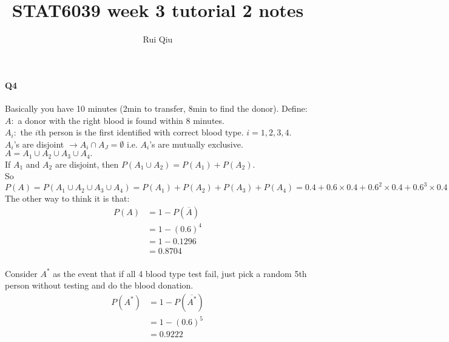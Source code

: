 \documentclass[a4paper, 11pt, twoside]{article}
\begin{document}
\title{STAT6039 week 3 tutorial 2 notes}
\author{Rui Qiu}

\maketitle

\paragraph{Q4}

Basically you have 10 minutes (2min to transfer, 8min to find the donor). Define:\\

$A:$ a donor with the right blood is found within 8 minutes.\\

$A_i:$ the $i$th person is the first identified with correct blood type. $i=1,2,3,4.$\\

$A_i$'s are disjoint $\rightarrow A_i\cap A_J = \emptyset$ i.e. $A_i$'s are mutually exclusive.\\

$A = A_1\cup A_2\cup A_3\cup A_4.$\\

If $A_1$ and $A_2$ are disjoint, then $P(A_1\cup A_2)= P(A_1)+P(A_2).$\\

So $P(A)=P(A_1\cup A_2\cup A_3\cup A_4) = P(A_1)+P(A_2)+P(A_3)+P(A_4)=0.4+0.6\times0.4+0.6^2\times 0.4 + 0.6^3\times 0.4 = 0.8704.$\\

The other way to think it is that:\\

\[
\begin{split}
	P(A) &= 1 - P(\overline{A})\\
	&=1-(0.6)^4\\
	&=1-0.1296\\
	&=0.8704\\
\end{split}
\]

Consider $A^*$ as the event that if all 4 blood type test fail, just pick a random 5th person without testing and do the blood donation.\\

\[
\begin{split}
	P(A^*) &= 1 - P(\overline{A^*})\\
	&= 1- (0.6)^5\\
	&= 0.9222\\
\end{split}
\]
\end{document}
